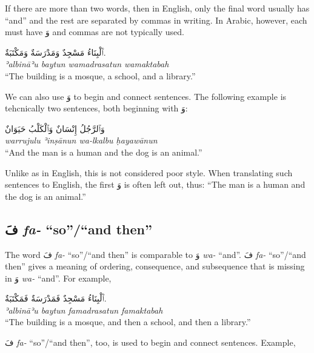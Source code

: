 \documentclass[
  10pt,
]{book}
\begin{document}
If there are more than two words, then in English, only the final word usually has \enquote{and} and the rest are separated by commas in writing. In Arabic, however, each must have \foreignlanguage{arabic}{وَ} and commas are not typically used.

\foreignlanguage{arabic}{ٱَلْبِنَاءُ مَسْجِدٌ وَمَدْرَسَةٌ وَمَکْتَبَةٌ.}\\
\emph{ʾalbināʾu baytun wamadrasatun wamaktabah}\\
\enquote{The building is a mosque, a school, and a library.}

We can also use \foreignlanguage{arabic}{وَ} to begin and connect sentences. The following example is tehcnically two sentences, both beginning with \foreignlanguage{arabic}{وَ}:

\foreignlanguage{arabic}{وَٱلرَّجُلُ إِنْسَانٌ وَٱلْکَلْبُ حَيَوَانٌ}\\
\emph{warrujulu ʾinṣānun wa-lkalbu ḥayawānun}\\
\enquote{And the man is a human and the dog is an animal.}

Unlike as in English, this is not considered poor style. When translating such sentences to English, the first \foreignlanguage{arabic}{وَ} is often left out, thus:
\enquote{The man is a human and the dog is an animal.}

\subsection{\texorpdfstring{\foreignlanguage{arabic}{فَ} \emph{fa-} \enquote{so}/\enquote{and then}}{فَ fa- ``so''/``and then''}}\label{ux641-fa--soand-then}

The word \foreignlanguage{arabic}{فَ} \emph{fa-} \enquote{so}/\enquote{and then} is comparable to \foreignlanguage{arabic}{وَ} \emph{wa-} \enquote{and}.
\foreignlanguage{arabic}{فَ} \emph{fa-} \enquote{so}/\enquote{and then}
gives a meaning of ordering, consequence, and subsequence that is missing in \foreignlanguage{arabic}{وَ} \emph{wa-} \enquote{and}. For example,

\foreignlanguage{arabic}{ٱَلْبِنَاءُ مَسْجِدٌ فَمَدْرَسَةٌ فَمَکْتَبَةٌ.}\\
\emph{ʾalbināʾu baytun famadrasatun famaktabah}\\
\enquote{The building is a mosque, and then a school, and then a library.}

\foreignlanguage{arabic}{فَ} \emph{fa-} \enquote{so}/\enquote{and then}, too, is used to begin and connect sentences. Example,
\end{document}
